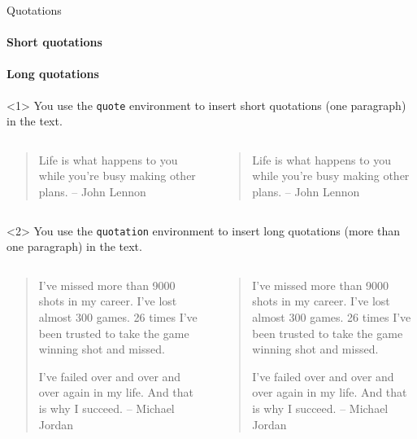 \begin{frame}[fragile,c]{Quotations}
\framesubtitle<1>{Short quotations}
\framesubtitle<2>{Long quotations}
\begin{onlyenv}<1>
	You use the \texttt{quote} environment to insert short quotations (one paragraph)
	in the text.
	
	\begin{columns}
		\begin{column}{.49\textwidth}
			\vspace{-17mm}
\begin{codesource}
	\begin{quote}
		Life is what happens to you while 
		you're busy making other plans. 
		-- John Lennon
	\end{quote}
\end{codesource}
		\end{column}
		
		\begin{column}{.49\textwidth}
			\begin{quote}
				Life is what happens to you while you're busy making other plans. -- John Lennon
			\end{quote}
		\end{column}
	\end{columns}
\end{onlyenv}

\begin{onlyenv}<2>
	You use the \texttt{quotation} environment to insert long quotations (more than one paragraph)
	in the text.
	
	\begin{columns}
		\begin{column}{.49\textwidth}
			\vspace{-38mm}
\begin{codesource}
	\begin{quotation}
		I've missed more than 9000 shots in my 
		career. I've lost almost 300 games. 26 
		times I've been trusted to take the game 
		winning shot and missed.
		
		I've failed over and over and over again 
		in my life. And that is why I succeed. 
		-- Michael Jordan
	\end{quotation}
\end{codesource}	
		\end{column}
		
		\begin{column}{.49\textwidth}
			\begin{quotation}
				I've missed more than 9000 shots in my career. 
				I've lost almost 300 games. 26 times I've been 
				trusted to take the game winning shot and missed.
				
				I've failed over and over and over again in my life. 
				And that is why I succeed. -- Michael Jordan
			\end{quotation}
		\end{column}
	\end{columns}
\end{onlyenv}
\end{frame}

